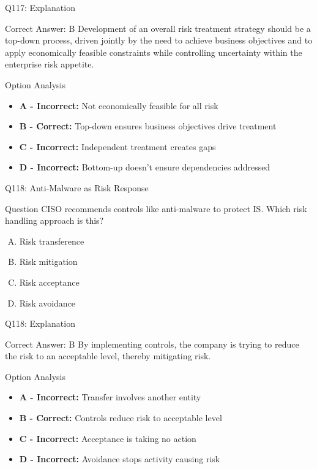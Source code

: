 \documentclass{beamer}
\begin{document}
	\begin{frame}{Q117: Explanation}
		\begin{block}{Correct Answer: B}
			Development of an overall risk treatment strategy should be a top-down process, driven jointly by the need to achieve business objectives and to apply economically feasible constraints while controlling uncertainty within the enterprise risk appetite.
		\end{block}
		\begin{block}{Option Analysis}
			\begin{itemize}
				\item \textbf{A - Incorrect:} Not economically feasible for all risk
				\item \textbf{B - Correct:} Top-down ensures business objectives drive treatment
				\item \textbf{C - Incorrect:} Independent treatment creates gaps
				\item \textbf{D - Incorrect:} Bottom-up doesn't ensure dependencies addressed
			\end{itemize}
		\end{block}
	\end{frame}
	
	\begin{frame}{Q118: Anti-Malware as Risk Response}
		\begin{block}{Question}
			CISO recommends controls like anti-malware to protect IS. Which risk handling approach is this?
		\end{block}
		\begin{enumerate}[(A)]
			\item Risk transference
			\item Risk mitigation
			\item Risk acceptance
			\item Risk avoidance
		\end{enumerate}
	\end{frame}
	
	\begin{frame}{Q118: Explanation}
		\begin{block}{Correct Answer: B}
			By implementing controls, the company is trying to reduce the risk to an acceptable level, thereby mitigating risk.
		\end{block}
		\begin{block}{Option Analysis}
			\begin{itemize}
				\item \textbf{A - Incorrect:} Transfer involves another entity
				\item \textbf{B - Correct:} Controls reduce risk to acceptable level
				\item \textbf{C - Incorrect:} Acceptance is taking no action
				\item \textbf{D - Incorrect:} Avoidance stops activity causing risk
			\end{itemize}
		\end{block}
	\end{frame}
	
\end{document}
